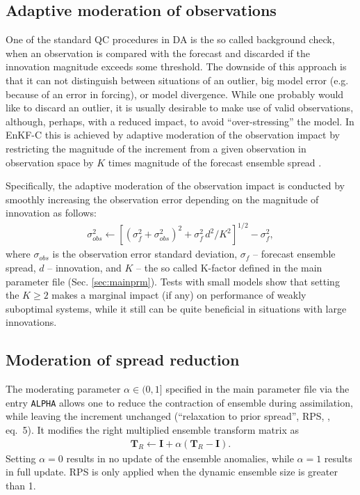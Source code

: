 \documentclass[11pt]{report}
\newcommand{\mb} {\mathbf}
\begin{document}
\subsection{Adaptive moderation of observations}
\label{sec:kfactor}

One of the standard QC procedures in DA is the so called background check, when an observation is compared with the forecast and discarded if the innovation magnitude exceeds some threshold.
The downside of this approach is that it can not distinguish between situations of an outlier, big model error (e.g. because of an error in forcing), or model divergence.
While one probably would like to discard an outlier, it is usually desirable to make use of valid observations, although, perhaps, with a reduced impact, to avoid ``over-stressing'' the model.
In EnKF-C this is achieved by adaptive moderation of the observation impact by restricting the magnitude of the increment from a given observation in observation space by $K$ times magnitude of the forecast ensemble spread \citep{sak17a}.

Specifically, the adaptive moderation of the observation impact is conducted by smoothly increasing the observation error depending on the magnitude of innovation as follows:
\begin{align*}
  \sigma^2_{obs} \leftarrow \left[(\sigma_{f}^2 + \sigma_{obs}^2)^2 + \sigma_f^2 \, d^2 / K^2\right]^{1/2} - \sigma_f^2,
\end{align*}
where $\sigma_{obs}$ is the observation error standard deviation, $\sigma_f$ -- forecast ensemble spread, $d$ -- innovation, and $K$ -- the so called K-factor defined in the main parameter file (Sec. \ref{sec:mainprm}).
Tests with small models show that setting the $K \ge 2$ makes a marginal impact (if any) on performance of weakly suboptimal systems, while it still can be quite beneficial in situations with large innovations.

\subsection{Moderation of spread reduction}
\label{sec:rps}

The moderating parameter $\alpha \in (0, 1]$ specified in the main parameter file via the entry \verb|ALPHA| allows one to reduce the contraction of ensemble during assimilation, while leaving the increment unchanged (``relaxation to prior spread'', RPS, \citealt{zha04a}, eq.~5).
It modifies the right multiplied ensemble transform matrix as
\begin{align*}
  \mb T_R \leftarrow \mb I + \alpha (\mb T_R - \mb I).
\end{align*}
Setting $\alpha = 0$ results in no update of the ensemble anomalies, while $\alpha = 1$ results in full update.
RPS is only applied when the dynamic ensemble size is greater than 1.
\end{document}
